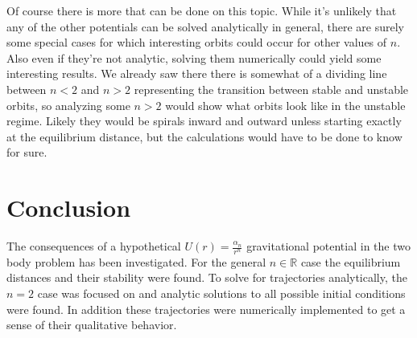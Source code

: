 \documentclass[letterpaper, reqno,11pt]{article}
\begin{document}
Of course there is more that can be done on this topic. While it's unlikely that any of the other potentials can be solved analytically in general, there are surely some special cases for which interesting orbits could occur for other values of $n$. Also even if they're not analytic, solving them numerically could yield some interesting results. We already saw there there is somewhat of a dividing line between $n<2$ and  $n>2$ representing the transition between stable and unstable orbits, so analyzing some $n>2$ would show what orbits look like in the unstable regime. Likely they would be spirals inward and outward unless starting exactly at the equilibrium distance, but the calculations would have to be done to know for sure. 

\section{Conclusion}

The consequences of a hypothetical $U(r)=\frac{\alpha_n}{r^{n}}$ gravitational potential in the two body problem has been investigated. For the general $n\in\mathbb{R}$ case the equilibrium distances and their stability were found. To solve for trajectories analytically, the $n=2$ case was focused on and analytic solutions to all possible initial conditions were found. In addition these trajectories were numerically implemented to get a sense of their qualitative behavior. 
\end{document}
